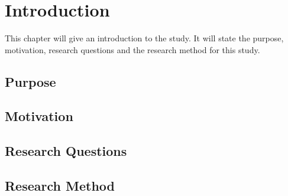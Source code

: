 \chapter{Introduction}
\label{introduction}

This chapter will give an introduction to the study. It will state the purpose, motivation, research questions and the research method for this study. 

\section{Purpose}
\label{purpose}


\section{Motivation}
\label{motivation}


\section{Research Questions}
\label{reseachquestions}


\section{Research Method}
\label{researchmethod}


